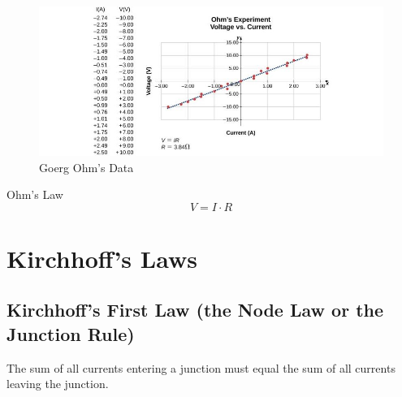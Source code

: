 \documentclass[14pt]{memoir}
\begin{document}
\begin{figure}[H]
\begin{center}
\includegraphics[scale=0.50]{fig/fig_09_20.jpg}
\caption{Goerg Ohm's Data}
\label{fig:09_20}
\end{center}
\end{figure}

Ohm's Law
\begin{equation}
V = I \cdot R
\end{equation}


\section{Kirchhoff's Laws}

\subsection{Kirchhoff's First Law (the Node Law or the Junction Rule)} 
The sum of all currents entering a junction must equal the sum of all currents leaving the junction.
\end{document}
